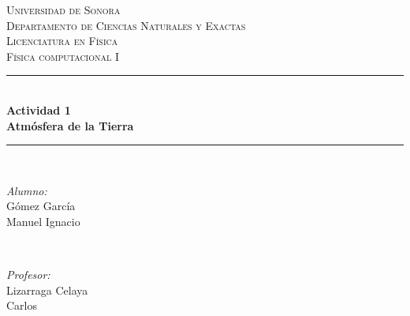\begin{titlepage}

\newcommand{\HRule}{\rule{\linewidth}{0.5mm}} %

\center %
 

\textsc{\LARGE Universidad de Sonora }\\[0.3cm] %
\textsc{\Large Departamento de Ciencias Naturales y Exactas  }\\[0.3cm]
\textsc{\Large Licenciatura en Física }\\[0.3cm]
\textsc{\Large Física computacional I}\\[0.5cm] %


\HRule \\[0.4cm]
{ \huge \bfseries Actividad 1\\  Atmósfera de la Tierra}\\[0.03cm] %
\HRule \\[1.5cm]

 

\begin{minipage}{0.4\textwidth}
\begin{flushleft} \large
\emph{Alumno:}\\
Gómez García \\Manuel Ignacio\\ %
\end{flushleft}
\end{minipage}
~
\begin{minipage}{0.4\textwidth}
\begin{flushright} \large
\emph{Profesor:} \\
Lizarraga Celaya\\Carlos\\%
\end{flushright}
\end{minipage}\\[1cm]


\end{titlepage}
